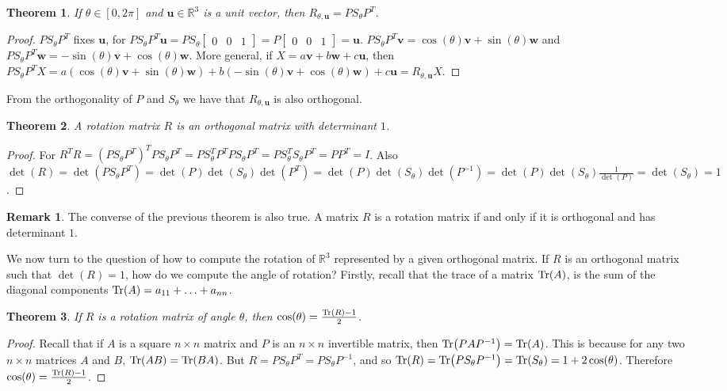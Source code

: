\documentclass[oneside]{book}
\newtheorem{theorem}{Theorem}[section]
\theoremstyle{definition}
\newtheorem{remark}{Remark}[section]
\newcommand*\B[1]{\mathbf{#1}}
\begin{document}
\begin{theorem}
If $\theta \in [0,2\pi]$ and $\B{u}\in \mathbb{R}^3$ is a unit vector, then $R_{\theta, \B{u}} = PS_{\theta}P^T$.
\end{theorem}
\begin{proof}
$PS_{\theta}P^T$ fixes $\B{u}$, for $PS_{\theta}P^T\B{u} = PS_{\theta} \begin{bmatrix}0 & 0 & 1 \end{bmatrix} = P\begin{bmatrix} 0 & 0 & 1 \end{bmatrix} = \B{u}$. $PS_{\theta}P^T\B{v} = \cos(\theta)\B{v}+\sin(\theta) \B{w}$ and $PS_{\theta}P^T \B{w} = -\sin(\theta) \B{v}+\cos(\theta) \B{w}$. More general, if $X = a\B{v}+b\B{w}+c\B{u}$, then $PS_{\theta}P^TX = a(\cos(\theta)\B{v}+\sin(\theta)\B{w})+b(-\sin(\theta) \B{v}+\cos(\theta)\B{w})+c\B{u} = R_{\theta,\B{u}}X$.
\end{proof}

From the orthogonality of $P$ and $S_{\theta}$ we have that $R_{\theta,\B{u}}$ is also orthogonal.

\begin{theorem}
A rotation matrix $R$ is an orthogonal matrix with determinant $1$.
\end{theorem}
\begin{proof}
For $R^TR = (PS_{\theta}P^T)^TPS_{\theta}P^T = PS_{\theta}^TP^TPS_{\theta}P^T = PS_{\theta}^TS_{\theta}P^T = PP^T = I$. Also $\det(R) = \det(PS_{\theta}P^T) = \det(P)\det(S_{\theta})\det(P^T) = \det(P)\det(S_{\theta})\det(P^{-1}) = \det(P)\det(S_{\theta})\frac{1}{\det(P)} = \det(S_{\theta}) = 1$.
\end{proof}

\begin{remark}
The converse of the previous theorem is also true. A matrix $R$ is a rotation matrix if and only if it is orthogonal and has determinant $1$.
\end{remark}

We now turn to the question of how to compute the rotation of $\mathbb{R}^3$ represented by a given orthogonal matrix. If $R$ is an orthogonal matrix such that $\det(R) = 1$, how do we compute the angle of rotation? Firstly, recall that the trace of a matrix $\Tr(A)$, is the sum of the diagonal components $\Tr(A) = a_{11}+\hdots + a_{nn}$.

\begin{theorem}
If $R$ is a rotation matrix of angle $\theta$, then $\cos(\theta) = \frac{\Tr(R) - 1}{2}$.
\end{theorem}
\begin{proof}
Recall that if $A$ is a square $n\times n$ matrix and $P$ is an $n\times n$ invertible matrix, then $\Tr(PAP^{-1}) = \Tr(A)$. This is because for any two $n\times n$ matrices $A$ and $B$, $\Tr(AB) = \Tr(BA)$. But $R = PS_{\theta} P^T = PS_{\theta}P^{-1}$, and so $\Tr(R) = \Tr(PS_{\theta}P^{-1}) = \Tr(S_{\theta}) = 1+2\cos(\theta)$. Therefore $\cos(\theta) = \frac{\Tr(R)-1}{2}$.
\end{proof}
\end{document}
